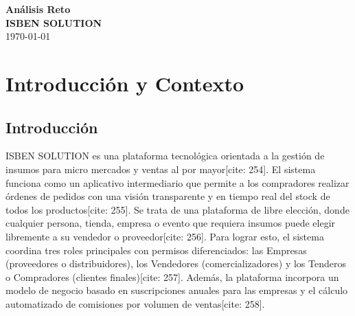\documentclass[11pt,a4paper]{report}
\begin{document}
\begin{titlepage}
    \centering
    \vspace*{3cm}
    {\Huge\bfseries\color{primary} Análisis Reto} \\[1cm] %
    {\LARGE\bfseries ISBEN SOLUTION} \\[2cm]
    {\Large \today}
\end{titlepage}

\tableofcontents %
\newpage

\chapter{Introducción y Contexto} %

\section{Introducción}
ISBEN SOLUTION es una plataforma tecnológica orientada a la gestión de insumos para micro mercados y ventas al por mayor[cite: 254]. El sistema funciona como un aplicativo intermediario que permite a los compradores realizar órdenes de pedidos con una visión transparente y en tiempo real del stock de todos los productos[cite: 255]. Se trata de una plataforma de libre elección, donde cualquier persona, tienda, empresa o evento que requiera insumos puede elegir libremente a su vendedor o proveedor[cite: 256]. Para lograr esto, el sistema coordina tres roles principales con permisos diferenciados: las Empresas (proveedores o distribuidores), los Vendedores (comercializadores) y los Tenderos o Compradores (clientes finales)[cite: 257]. Además, la plataforma incorpora un modelo de negocio basado en suscripciones anuales para las empresas y el cálculo automatizado de comisiones por volumen de ventas[cite: 258].
\end{document}

